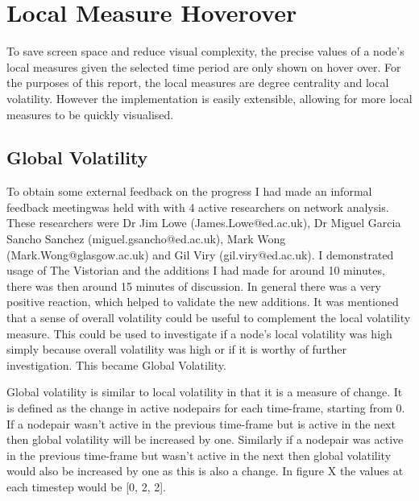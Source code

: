 
\section{Local Measure Hoverover}
To save screen space and reduce visual complexity, the precise values of a node's local measures given the selected time period are only shown on hover over. For the purposes of this report, the local measures are degree centrality and local volatility. However the implementation is easily extensible, allowing for more local measures to be quickly visualised.


\subsection{Global Volatility}

To obtain some external feedback on the progress I had made an informal feedback meetingwas held with with 4 active researchers on network analysis. These researchers were Dr Jim Lowe (James.Lowe@ed.ac.uk), Dr Miguel Garcia Sancho Sanchez (miguel.gsancho@ed.ac.uk), Mark Wong (Mark.Wong@glasgow.ac.uk) and Gil Viry (gil.viry@ed.ac.uk). I demonstrated usage of The Vistorian and the additions I had made for around 10 minutes, there was then around 15 minutes of discussion. In general there was a very positive reaction, which helped to validate the new additions. It was mentioned that a sense of overall volatility could be useful to complement the local volatility measure. This could be used to investigate if a node's local volatility was high simply because overall volatility was high or if it is worthy of further investigation. This became Global Volatility.

Global volatility is similar to local volatility in that it is a measure of change. It is defined as the change in active nodepairs for each time-frame, starting from 0. If a nodepair wasn't active in the previous time-frame but is active in the next then global volatility will be increased by one. Similarly if a nodepair was active in the previous time-frame but wasn't active in the next then global volatility would also be increased by one as this is also a change. In figure X the values at each timestep would be [0, 2, 2].

